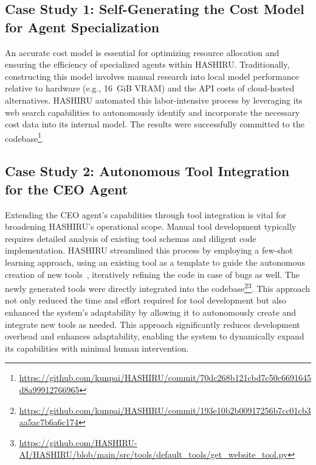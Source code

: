 \documentclass[conference]{IEEEtran}
\begin{document}
\subsection{Case Study 1: Self-Generating the Cost Model for Agent Specialization}
\label{sec:casestudy1_costmodel}
An accurate cost model is essential for optimizing resource allocation and ensuring the efficiency of specialized agents within HASHIRU. Traditionally, constructing this model involves manual research into local model performance relative to hardware (e.g., 16~GiB VRAM) and the API costs of cloud-hosted alternatives. HASHIRU automated this labor-intensive process by leveraging its web search capabilities to autonomously identify and incorporate the necessary cost data into its internal model. The results were successfully committed to the codebase\footnote{\url{https://github.com/kunpai/HASHIRU/commit/70dc268b121cbd7c50c6691645d8a99912766965}}.

\subsection{Case Study 2: Autonomous Tool Integration for the CEO Agent}
\label{sec:casestudy2_tools}
Extending the CEO agent's capabilities through tool integration is vital for broadening HASHIRU's operational scope. Manual tool development typically requires detailed analysis of existing tool schemas and diligent code implementation. HASHIRU streamlined this process by employing a few-shot learning approach, using an existing tool as a template to guide the autonomous creation of new tools~\cite{brown2020language}, iteratively refining the code in case of bugs as well. The newly generated tools were directly integrated into the codebase\footnote{\url{https://github.com/kunpai/HASHIRU/commit/193e10b2b00917256b7cc01cb3aa5ac7b6a6c174}}\footnote{\url{https://github.com/HASHIRU-AI/HASHIRU/blob/main/src/tools/default_tools/get_website_tool.py}}. This approach not only reduced the time and effort required for tool development but also enhanced the system's adaptability by allowing it to autonomously create and integrate new tools as needed.
This approach significantly reduces development overhead and enhances adaptability, enabling the system to dynamically expand its capabilities with minimal human intervention.
\end{document}
